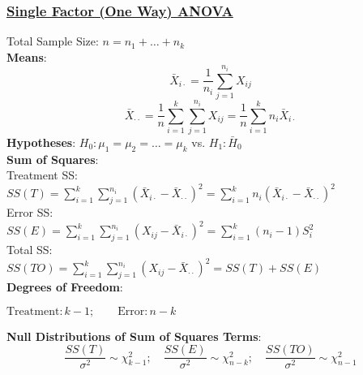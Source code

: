 \documentclass{article}
\begin{document}
\begin{multicols*}{2}
\subsubsection*{\underline{Single Factor (One Way) ANOVA}}
Total Sample Size: $n = n_{1} + \dots + n_{k}$\\
\textbf{Means}: $$\bar{X}_{i\cdot} = \frac{1}{n_{i}}\sum_{j=1}^{n_{i}} X_{ij}$$
$$\bar{X}_{\cdot \cdot} = \frac{1}{n}\sum_{i=1}^{k} \sum_{j=1}^{n_{i}} X_{ij} = \frac{1}{n}\sum_{i=1}^{k} n_{i}\bar{X}_{i\cdot}$$
\textbf{Hypotheses}: $H_{0}: \mu_{1} = \mu_{2} = \dots = \mu_{k}$ vs. $H_{1}: \bar{H}_{0}$\\
\textbf{Sum of Squares}:\\
Treatment SS:\\
$SS(T) = \sum_{i=1}^{k} \sum_{j=1}^{n_{i}} (\bar{X}_{i\cdot} - \bar{X}_{\cdot \cdot})^{2} = \sum_{i=1}^{k} n_{i} (\bar{X}_{i\cdot} - \bar{X}_{\cdot \cdot})^{2}$\\
Error SS:\\
$SS(E) = \sum_{i=1}^{k} \sum_{j=1}^{n_{i}} (X_{ij} - \bar{X}_{i\cdot})^{2} = \sum_{i=1}^{k} (n_{i} - 1) S_{i}^{2}$\\
Total SS:\\
$SS(TO) = \sum_{i=1}^{k} \sum_{j=1}^{n_{i}} (X_{ij} - \bar{X}_{\cdot \cdot})^{2} = SS(T) + SS(E)$\\
\textbf{Degrees of Freedom}:\\
\centerline{$\mbox{Treatment}: k-1; \qquad \mbox{Error}: n-k$}
\textbf{Null Distributions of Sum of Squares Terms}:
$$\frac{SS(T)}{\sigma^{2}} \sim \chi^{2}_{k-1}; \quad \frac{SS(E)}{\sigma^{2}} \sim \chi^{2}_{n-k}; \quad \frac{SS(TO)}{\sigma^{2}} \sim \chi^{2}_{n-1}$$


\end{multicols*}
\end{document}
